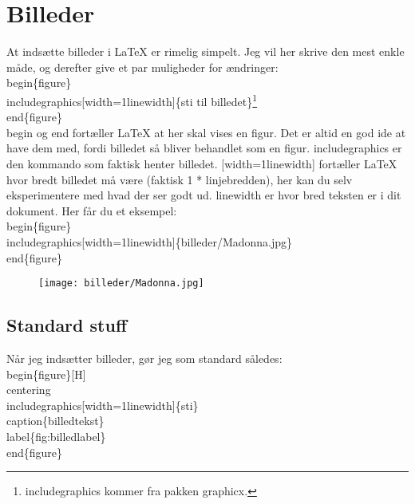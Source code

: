 \chapter{Billeder}

At indsætte billeder i LaTeX er rimelig simpelt. Jeg vil her skrive den mest enkle måde, og derefter give et par muligheder for ændringer:\\

\indent \bs begin\{figure\}\\
\indent \bs includegraphics[width=1\bs linewidth]\{sti til billedet\}\footnote{\bs includegraphics kommer fra pakken graphicx.}\\
\indent \bs end\{figure\}\\

\noindent
\bs begin og \bs end fortæller LaTeX at her skal vises en figur. Det er altid en god ide at have dem med, fordi billedet så bliver behandlet som en figur. \bs includegraphics er den kommando som faktisk henter billedet. [width=1\bs linewidth] fortæller LaTeX hvor bredt billedet må være (faktisk 1 * linjebredden), her kan du selv eksperimentere med hvad der ser godt ud. \bs linewidth er hvor bred teksten er i dit dokument. Her får du et eksempel:\\

\indent \bs begin\{figure\}\\
\indent \bs includegraphics[width=1\bs linewidth]\{billeder/Madonna.jpg\}\\
\indent \bs end\{figure\}\\

\begin{figure}[H]
\texttt{[image: billeder/Madonna.jpg]}
\end{figure}

\section{Standard stuff}

Når jeg indsætter billeder, gør jeg som standard således:\\

\indent \bs begin\{figure\}[H]\\
\indent \bs centering\\
\indent \bs includegraphics[width=1\bs linewidth]\{sti\}\\
\indent \bs caption\{billedtekst\}\\
\indent \bs label\{fig:billedlabel\}\\
\indent \bs end\{figure\}\\

